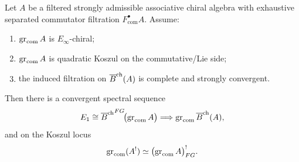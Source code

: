 \begin{theorem}
\label{thm:FG-shadow-core}
Let $A$ be a filtered strongly admissible associative chiral algebra with exhaustive separated
commutator filtration $F_{\mathrm{com}}^\bullet A$. Assume:
\begin{enumerate}[label=(\alph*)]
\item $\operatorname{gr}_{\mathrm{com}}A$ is $E_\infty$-chiral;
\item $\operatorname{gr}_{\mathrm{com}}A$ is quadratic Koszul on the commutative/Lie side;
\item the induced filtration on $\overline{B}^{\mathrm{ch}}(A)$ is complete and strongly convergent.
\end{enumerate}
Then there is a convergent spectral sequence
\[
E_1\cong {\overline{B}^{\mathrm{ch}}}^{FG}\!\bigl(\operatorname{gr}_{\mathrm{com}}A\bigr)
\Longrightarrow
\operatorname{gr}_{\mathrm{com}}\overline{B}^{\mathrm{ch}}(A),
\]
and on the Koszul locus
\[
\operatorname{gr}_{\mathrm{com}}(A^!)\simeq \bigl(\operatorname{gr}_{\mathrm{com}}A\bigr)^!_{FG}.
\]
\end{theorem}

